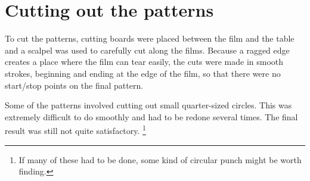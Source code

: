 \documentclass{article}
\begin{document}
\section{Cutting out the patterns}
To cut the patterns, cutting boards were placed between the film and the table and a scalpel was used to carefully cut along the films. Because a ragged edge creates a place where the film can tear easily, the cuts were made in smooth strokes, beginning and ending at the edge of the film, so that there were no start/stop points on the final pattern. %

Some of the patterns involved cutting out small quarter-sized circles. This was extremely difficult to do smoothly and had to be redone several times. The final result was still not quite satisfactory. \footnote{If many of these had to be done, some kind of circular punch might be worth finding.} 

\end{document}

